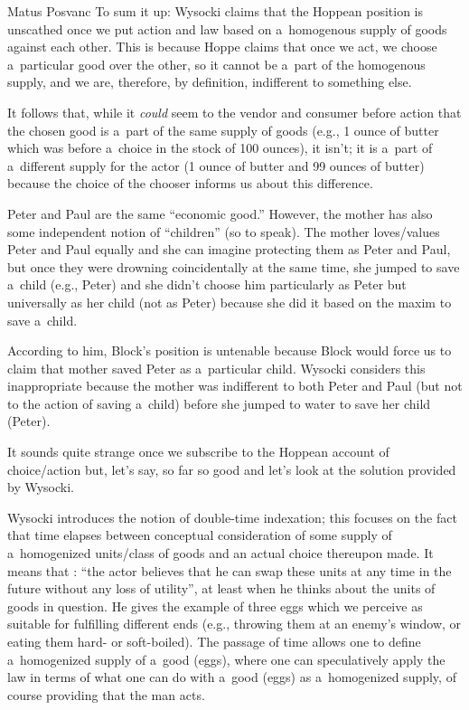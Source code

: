 \begin{artengenv}{Matus Posvanc}
To sum it up: Wysocki claims that the Hoppean position is unscathed once we put action and law based on a~homogenous supply of goods against each other. This is because Hoppe claims that once we act, we choose a~particular good over the other, so it cannot be a~part of the homogenous supply, and we are, therefore, by definition, indifferent to something else.



It follows that, while it \textit{could} seem to the vendor and consumer before action that the chosen good is a~part of the same supply of goods (e.g., 1 ounce of butter which was before a~choice in the stock of 100 ounces), it isn't; it is a~part of a~different supply for the actor (1 ounce of butter and 99 ounces of butter) because the choice of the chooser informs us about this difference.



Peter and Paul are the same ``economic good.'' However, the mother has also some independent notion of ``children'' (so to speak). The mother loves/values Peter and Paul equally and she can imagine protecting them as Peter and Paul, but once they were drowning coincidentally at the same time, she jumped to save a~child (e.g., Peter) and she didn't choose him particularly as Peter but universally as her child (not as Peter) because she did it based on the maxim to save a~child.



According to him, Block's position is untenable because Block would force us to claim that mother saved Peter as a~particular child. Wysocki considers this inappropriate because the mother was indifferent to both Peter and Paul (but not to the action of saving a~child) before she jumped to water to save her child (Peter).



It sounds quite strange once we subscribe to the Hoppean account of choice/action but, let's say, so far so good and let's look at the solution provided by Wysocki.



Wysocki introduces the notion of double-time indexation; this focuses on the fact that time elapses between conceptual consideration of some supply of a~homogenized units/class of goods and an actual choice thereupon made. It means that 
\parencite[][p.39]{Wysocki2021problem}: %
 ``the actor believes that he can swap these units at any time in the future without any loss of utility'', at least when he thinks about the units of goods in question. He gives the example of three eggs which we perceive as suitable for fulfilling different ends (e.g., throwing them at an enemy's window, or eating them hard- or soft-boiled). The passage of time allows one to define a~homogenized supply of a~good (eggs), where one can speculatively apply the law in terms of what one can do with a~good (eggs) as a~homogenized supply, of course providing that the man acts.




\end{artengenv}
